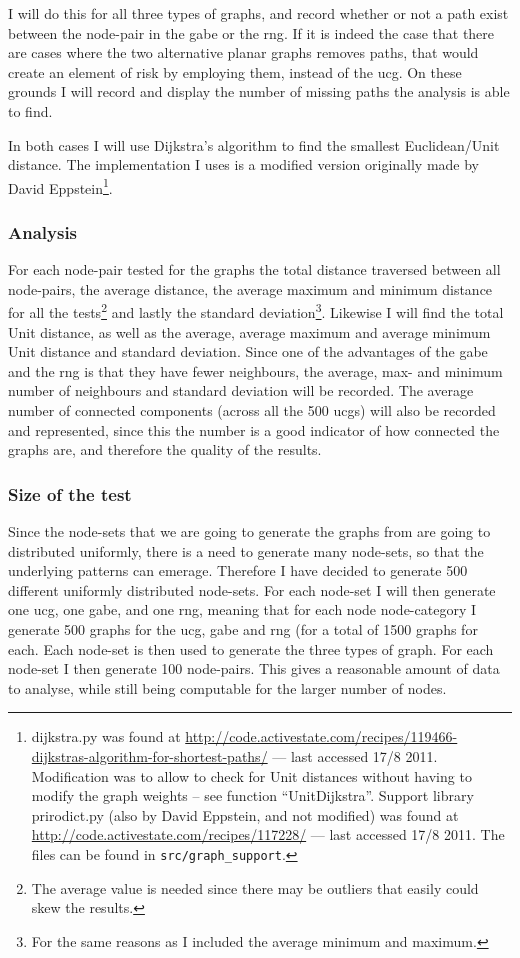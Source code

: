 I will do this for all three types of graphs, and record whether or not a path exist between the node-pair in the \ac{gabe} or the \ac{rng}. If it is indeed the case that there are cases where the two alternative planar graphs removes paths, that would create an element of risk by employing them, instead of the \ac{ucg}. On these grounds I will record and display the number of missing paths the analysis is able to find.

In both cases I will use Dijkstra's algorithm to find the smallest Euclidean/Unit distance. The implementation I uses is a modified version originally made by David Eppstein\footnote{dijkstra.py was found at \url{http://code.activestate.com/recipes/119466-dijkstras-algorithm-for-shortest-paths/} --- last accessed 17/8 2011. Modification was to allow to check for Unit distances without having to modify the graph weights -- see function ``UnitDijkstra''. Support library prirodict.py (also by David Eppstein, and not modified) was found at \url{http://code.activestate.com/recipes/117228/} --- last accessed 17/8 2011. The files can be found in \texttt{src/graph\_support}.}.

\subsubsection{Analysis}
For each node-pair tested for the graphs the total distance traversed between all node-pairs, the average distance, the average maximum and minimum distance for all the tests\footnote{The average value is needed since there may be outliers that easily could skew the results.} and lastly the standard deviation\footnote{For the same reasons as I included the average minimum and maximum.}. Likewise I will find the total Unit distance, as well as the average, average maximum and average minimum Unit distance and standard deviation. Since one of the advantages of the \ac{gabe} and the \ac{rng} is that they have fewer neighbours, the average, max- and minimum number of neighbours and standard deviation will be recorded. The average number of connected components (across all the 500 \acp{ucg}) will also be recorded and represented, since this the number is a good indicator of how connected the graphs are, and therefore the quality of the results.

\subsubsection{Size of the test}
Since the node-sets that we are going to generate the graphs from are going to distributed uniformly, there is a need to generate many node-sets, so that the underlying patterns can emerage. Therefore I have decided to generate 500 different uniformly distributed node-sets. For each node-set I will then generate one \ac{ucg}, one \ac{gabe}, and one \ac{rng}, meaning that for each node node-category I  generate 500 graphs for the \ac{ucg}, \ac{gabe} and \ac{rng} (for a total of 1500 graphs for each. Each node-set is then used to generate the three types of graph. For each node-set I then generate 100 node-pairs. This gives a reasonable amount of data to analyse, while still being computable for the larger number of nodes.

